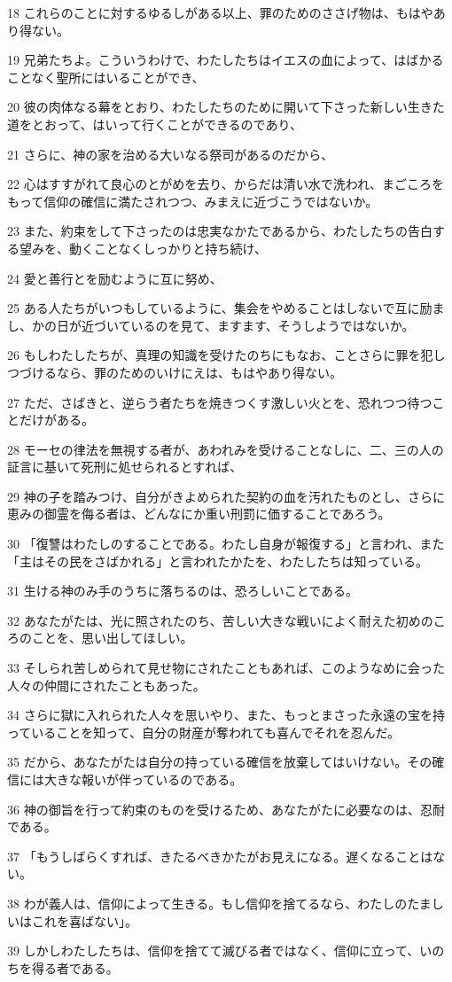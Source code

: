 \par 18 これらのことに対するゆるしがある以上、罪のためのささげ物は、もはやあり得ない。
\par 19 兄弟たちよ。こういうわけで、わたしたちはイエスの血によって、はばかることなく聖所にはいることができ、
\par 20 彼の肉体なる幕をとおり、わたしたちのために開いて下さった新しい生きた道をとおって、はいって行くことができるのであり、
\par 21 さらに、神の家を治める大いなる祭司があるのだから、
\par 22 心はすすがれて良心のとがめを去り、からだは清い水で洗われ、まごころをもって信仰の確信に満たされつつ、みまえに近づこうではないか。
\par 23 また、約束をして下さったのは忠実なかたであるから、わたしたちの告白する望みを、動くことなくしっかりと持ち続け、
\par 24 愛と善行とを励むように互に努め、
\par 25 ある人たちがいつもしているように、集会をやめることはしないで互に励まし、かの日が近づいているのを見て、ますます、そうしようではないか。
\par 26 もしわたしたちが、真理の知識を受けたのちにもなお、ことさらに罪を犯しつづけるなら、罪のためのいけにえは、もはやあり得ない。
\par 27 ただ、さばきと、逆らう者たちを焼きつくす激しい火とを、恐れつつ待つことだけがある。
\par 28 モーセの律法を無視する者が、あわれみを受けることなしに、二、三の人の証言に基いて死刑に処せられるとすれば、
\par 29 神の子を踏みつけ、自分がきよめられた契約の血を汚れたものとし、さらに恵みの御霊を侮る者は、どんなにか重い刑罰に価することであろう。
\par 30 「復讐はわたしのすることである。わたし自身が報復する」と言われ、また「主はその民をさばかれる」と言われたかたを、わたしたちは知っている。
\par 31 生ける神のみ手のうちに落ちるのは、恐ろしいことである。
\par 32 あなたがたは、光に照されたのち、苦しい大きな戦いによく耐えた初めのころのことを、思い出してほしい。
\par 33 そしられ苦しめられて見せ物にされたこともあれば、このようなめに会った人々の仲間にされたこともあった。
\par 34 さらに獄に入れられた人々を思いやり、また、もっとまさった永遠の宝を持っていることを知って、自分の財産が奪われても喜んでそれを忍んだ。
\par 35 だから、あなたがたは自分の持っている確信を放棄してはいけない。その確信には大きな報いが伴っているのである。
\par 36 神の御旨を行って約束のものを受けるため、あなたがたに必要なのは、忍耐である。
\par 37 「もうしばらくすれば、きたるべきかたがお見えになる。遅くなることはない。
\par 38 わが義人は、信仰によって生きる。もし信仰を捨てるなら、わたしのたましいはこれを喜ばない」。
\par 39 しかしわたしたちは、信仰を捨てて滅びる者ではなく、信仰に立って、いのちを得る者である。

